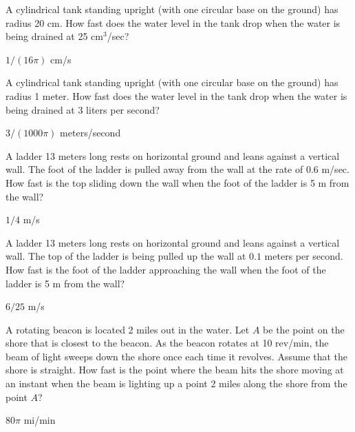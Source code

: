 \begin{exercises}

\begin{exercise}
A cylindrical tank standing upright (with one circular base on the
ground) has radius 20 cm.  How fast does the water level in the
tank drop when the water is being drained at 25 cm${}^3$/sec?
\begin{answer} $1/(16\pi)$ cm/s
\end{answer}\end{exercise}

\begin{exercise}
A cylindrical tank standing upright (with one circular base on the
ground) has radius 1 meter.  How fast does the water level in the
tank drop when the water is being drained at 3 liters per second?
\begin{answer} $3/(1000\pi)$ meters/second
\end{answer}\end{exercise}

\begin{exercise} A ladder 13 meters long rests on horizontal ground and leans
against a vertical wall.  The foot of the ladder is pulled away from
the wall at the rate of 0.6 m/sec.  How fast is the top sliding down
the wall when the foot of the ladder is 5 m from the wall?
\begin{answer} $1/4$ m/s
\end{answer}\end{exercise}

\begin{exercise} A ladder 13 meters long rests on horizontal ground and leans
against a vertical wall. The top of the ladder is being pulled up the
wall at $0.1$ meters per second.
How fast is the foot of the ladder approaching 
the wall when the foot of the ladder is 5 m from the wall?
\begin{answer} $6/25$ m/s
\end{answer}\end{exercise}

\begin{exercise}
A rotating beacon is located 2 miles out in the water.  Let $A$ be the
point on the shore that is closest to the beacon.  As the beacon rotates at
10 rev/min, the beam of light sweeps down the shore once each time it revolves.
Assume that the shore is straight.  How fast is the point where the beam
hits the shore moving at an instant when the beam is lighting up a point 2
miles along the shore from the point $A$?
\begin{answer} $80\pi$ mi/min
\end{answer}\end{exercise}


\end{exercises}
